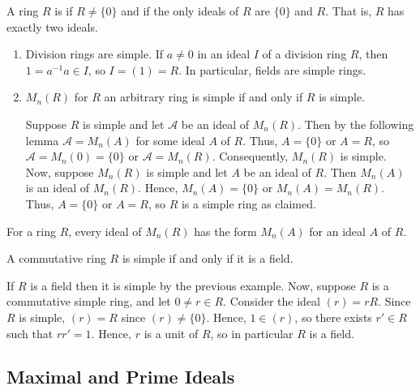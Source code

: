 \documentclass[12pt, a4paper, twoside, openright, titlepage]{book}
\begin{document}
\begin{defn}{}{}
    A ring $R$ is  if $R \neq \{0\}$ and if the only ideals of $R$ are $\{0\}$ and $R$. That is, $R$ has exactly two ideals.
\end{defn}

\begin{eg}{}{}
    \leavevmode
    \begin{enumerate}
        \item Division rings are simple. If $a \neq 0$ in an ideal $I$ of a division ring $R$, then $1 = a^{-1}a \in I$, so $I = (1) = R$. In particular, fields are simple rings.
        \item $M_n(R)$ for $R$ an arbitrary ring is simple if and only if $R$ is simple.
        \begin{proof*}{}{}
            Suppose $R$ is simple and let $\mathcal{A}$ be an ideal of $M_n(R)$. Then by the following lemma $\mathcal{A} = M_n(A)$ for some ideal $A$ of $R$. Thus, $A = \{0\}$ or $A = R$, so $\mathcal{A} = M_n(0) = \{0\}$ or $\mathcal{A} = M_n(R)$. Consequently, $M_n(R)$ is simple. Now, suppose $M_n(R)$ is simple and let $A$ be an ideal of $R$. Then $M_n(A)$ is an ideal of $M_n(R)$. Hence, $M_n(A) = \{0\}$ or $M_n(A) = M_n(R)$. Thus, $A = \{0\}$ or $A = R$, so $R$ is a simple ring as claimed.
        \end{proof*}
    \end{enumerate}
\end{eg}

\begin{lem}{}{}
    For a ring $R$, every ideal of $M_n(R)$ has the form $M_n(A)$ for an ideal $A$ of $R$.
\end{lem}

\begin{prop}{}{}
    A commutative ring $R$ is simple if and only if it is a field.
    \begin{proof*}{}{}
        If $R$ is a field then it is simple by the previous example. Now, suppose $R$ is a commutative simple ring, and let $0 \neq r \in R$. Consider the ideal $(r) = rR$. Since $R$ is simple, $(r) = R$ since $(r) \neq \{0\}$. Hence, $1 \in (r)$, so there exists $r' \in R$ such that $rr' = 1$. Hence, $r$ is a unit of $R$, so in particular $R$ is a field.
    \end{proof*}
\end{prop}

\subsection{\textsection Maximal and Prime Ideals}
\end{document}
